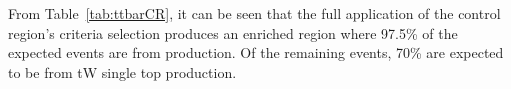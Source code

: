 From Table~\ref{tab:ttbarCR}, it can be seen that the full application of the control region's criteria selection produces an enriched region where 97.5\% of the expected events are from \ttbar production.
Of the remaining events, 70\% are expected to be from tW single top production.



